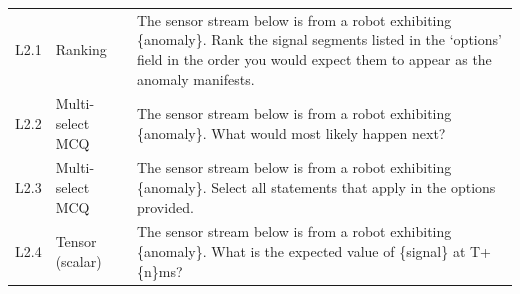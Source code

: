 \begin{small}
\begin{longtable}{@{}>{\centering\arraybackslash}p{}>{\raggedright\arraybackslash}p{}>{\raggedright\arraybackslash}p{}@{}}
        \multicolumn{3}{@{}l@{}}{\textbf{Level 2: Intervention}}                                                                                                                                                                                                                                                                                                                                                                                                                                                                                  \\
        \midrule
        L2.1        & Ranking                & The sensor stream below is from a robot exhibiting \{anomaly\}. Rank the signal segments listed in the `options' field in the order you would expect them to appear as the anomaly manifests.                                                                                                                                                                                                                                                                                                      \\
        L2.2        & Multi-select MCQ       & The sensor stream below is from a robot exhibiting \{anomaly\}. What would most likely happen next?                                                                                                                                                                                                                                                                                                                                                                                                \\
        L2.3        & Multi-select MCQ       & The sensor stream below is from a robot exhibiting \{anomaly\}. Select all statements that apply in the options provided.                                                                                                                                                                                                                                                                                                                                                                          \\
        L2.4        & Tensor (scalar)        & The sensor stream below is from a robot exhibiting \{anomaly\}. What is the expected value of \{signal\} at T+\{n\}ms?                                                                                                                                                                                                                                                                                                                                                                             \\

\end{longtable}
\end{small}
